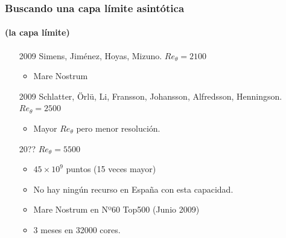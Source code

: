 \documentclass{beamer}
\begin{document}
\begin{frame}
\frametitle{Buscando una capa límite asintótica}
\framesubtitle{(la capa límite)}

\begin{itemize}
\item[2009] Simens, Jiménez, Hoyas, Mizuno. $Re_\theta = 2100$
  \begin{itemize}
  \item Mare Nostrum
  \end{itemize}
  \pause
\item[2009] Schlatter, Örlü, Li, Fransson, Johansson, Alfredsson,
  Henningson. $Re_\theta = 2500$
  \begin{itemize}
  \item Mayor $Re_\theta$ pero menor resolución.
  \end{itemize}
  \pause
\item[20??] $Re_\theta = 5500$
  \begin{itemize}
  \item $45 \times 10^9$ puntos (15 veces mayor)
  \item No hay ningún recurso en España con esta capacidad.
  \item Mare Nostrum en Nº60 Top500 (Junio 2009)
  \item 3 meses en 32000 cores.
  \end{itemize}
\end{itemize}

\pause

\begin{center}
\end{center}

\end{frame}
\end{document}
